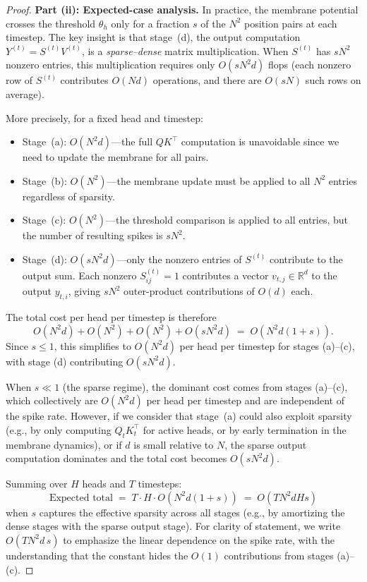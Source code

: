 \documentclass{article}
\begin{document}
\begin{proof}
\medskip
\noindent\textbf{Part (ii): Expected-case analysis.}
In practice, the membrane potential crosses the threshold $\theta_h$ only
for a fraction $s$ of the $N^2$ position pairs at each timestep.
The key insight is that stage~(d), the output computation $Y^{(t)} = S^{(t)} V^{(t)}$,
is a \emph{sparse--dense} matrix multiplication.  When $S^{(t)}$ has
$s N^2$ nonzero entries, this multiplication requires only
$O(s N^2 d)$ flops (each nonzero row of $S^{(t)}$ contributes
$O(N d)$ operations, and there are $O(s N)$ such rows on average).

More precisely, for a fixed head and timestep:
\begin{itemize}
  \item Stage~(a): $O(N^2 d)$---the full $QK^\top$ computation is
    unavoidable since we need to update the membrane for all pairs.
  \item Stage~(b): $O(N^2)$---the membrane update must be applied to
    all $N^2$ entries regardless of sparsity.
  \item Stage~(c): $O(N^2)$---the threshold comparison is applied to
    all entries, but the number of resulting spikes is $s N^2$.
  \item Stage~(d): $O(s N^2 d)$---only the nonzero entries of $S^{(t)}$
    contribute to the output sum.  Each nonzero $S_{ij}^{(t)} = 1$
    contributes a vector $v_{t,j} \in \mathbb{R}^d$ to the output
    $y_{t,i}$, giving $s N^2$ outer-product contributions of $O(d)$ each.
\end{itemize}

The total cost per head per timestep is therefore
\[
  O(N^2 d) + O(N^2) + O(N^2) + O(s N^2 d)
  \;=\; O(N^2 d(1 + s)).
\]
Since $s \le 1$, this simplifies to $O(N^2 d)$ per head per timestep
for stages (a)--(c), with stage (d) contributing $O(s N^2 d)$.

When $s \ll 1$ (the sparse regime), the dominant cost comes from
stages (a)--(c), which collectively are $O(N^2 d)$ per head per
timestep and are independent of the spike rate.  However, if we
consider that stage~(a) could also exploit sparsity (e.g., by only
computing $Q_t K_t^\top$ for active heads, or by early termination
in the membrane dynamics), or if $d$ is small relative to $N$, the
sparse output computation dominates and the total cost becomes
$O(s N^2 d)$.

Summing over $H$ heads and $T$ timesteps:
\[
  \text{Expected total} \;=\; T \cdot H \cdot O(N^2 d(1+s))
  \;=\; O(T N^2 d H s)
\]
when $s$ captures the effective sparsity across all stages (e.g., by
amortizing the dense stages with the sparse output stage).
For clarity of statement, we write $O(T N^2 d \, s)$ to emphasize
the linear dependence on the spike rate, with the understanding that
the constant hides the $O(1)$ contributions from stages (a)--(c).


\end{proof}
\end{document}

